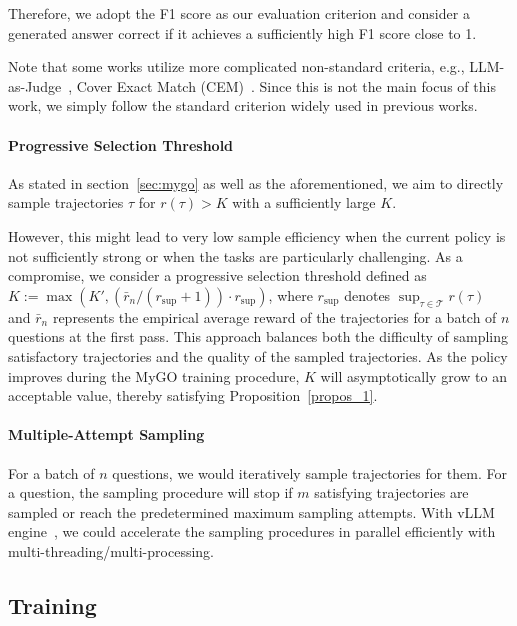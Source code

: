 Therefore, we adopt the F1 score as our evaluation criterion
 and consider a generated answer correct if it achieves a sufficiently high F1 score close to 1.

Note that some works utilize more complicated non-standard criteria, e.g., LLM-as-Judge~\cite{ReSearch,sun2025zerosearch}, Cover Exact Match (CEM)~\cite{sun2025zerosearch, song2025r1}.
Since this is not the main focus of this work, we simply follow the standard criterion widely used in previous works.



\paragraph{Progressive Selection Threshold}

As stated in section~\ref{sec:mygo} as well as the aforementioned, we aim to directly sample trajectories $\tau$ for $r(\tau) > K$ with a sufficiently large $K$.

However, this might lead to very low sample efficiency when the current policy is not sufficiently strong or when the tasks are particularly challenging. As a compromise, we consider a progressive selection threshold defined as $K:= \max(K', (\bar{r}_n/(r_\text{sup} + 1))\cdot r_\text{sup})$, where $r_\text{sup}$ denotes $\sup_{\tau \in \mathcal{T}} r(\tau)$ and $\bar{r}_n$ represents the empirical average reward of the trajectories for a batch of $n$ questions at the first pass. 
This approach balances both the difficulty of sampling satisfactory trajectories and the quality of the sampled trajectories. As the policy improves during the MyGO training procedure, $K$ will asymptotically grow to an acceptable value, thereby satisfying Proposition~\ref{propos_1}.

\paragraph{Multiple-Attempt Sampling}

For a batch of $n$ questions, 
we would iteratively sample trajectories for them.
For a question, the sampling procedure will stop if $m$ satisfying trajectories are sampled or reach the predetermined maximum sampling attempts.
With vLLM engine~\cite{kwon2023efficient}, we could accelerate the sampling procedures in parallel efficiently with multi-threading/multi-processing.


\subsection{Training}

